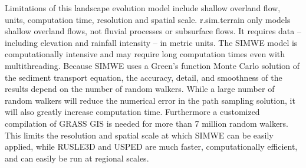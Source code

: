\documentclass[gmd, manuscript]{copernicus}
\begin{document}
Limitations of this landscape evolution model include
shallow overland flow, 
units, computation time, resolution and spatial scale.
r.sim.terrain only models shallow overland flows, 
not fluvial processes or subsurface flows. 
It requires data -- including 
elevation and rainfall intensity -- in metric units. 
The SIMWE model is computationally intensive 
and may require long computation times even with multithreading.
Because SIMWE uses a Green's function Monte Carlo solution 
of the sediment transport equation, 
the accuracy, detail, and smoothness of the results 
depend on the number of random walkers.
While a large number of random walkers will reduce the
numerical error in the path sampling solution,
it will also greatly increase computation time.
Furthermore a customized compilation of GRASS GIS 
is needed for more than 7 million random walkers.
This limits the resolution and spatial scale 
at which SIMWE can be easily applied,
while RUSLE3D and USPED are much faster, computationally efficient,
and can easily be run at regional scales. 


\end{document}
